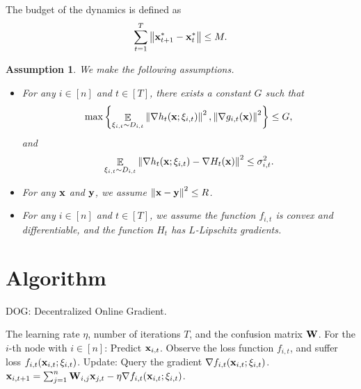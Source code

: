 \documentclass{article}
\newtheorem{Assumption}{\bf{Assumption}}
\begin{document}
The budget of the dynamics is defined as
\begin{align}
\nonumber
\sum_{t=1}^T \left\lVert{\bf x}_{t+1}^\ast - {\bf x}_t^\ast\right\rVert \le M.
\end{align}



\begin{Assumption}
\label{assumption_bounded_gradient_domain}
We make the following assumptions.
\begin{itemize}
\item For any $i\in[n]$ and $t\in[T]$, there exists a constant $G$ such that
\begin{align}
\nonumber
\max\left\{ \mathop{\mathbb{E}}_{ \xi_{i,t} \sim D_{i,t} }\left\lVert\nabla h_t({\bf x};\xi_{i,t})\right\rVert^2,  \left\lVert\nabla g_{i,t}({\bf x})\right\rVert^2 \right\} \le G,
\end{align} and 
\begin{align}
\nonumber
\mathop{\mathbb{E}}_{ \xi_{i,t} \sim D_{i,t} } \left\lVert\nabla h_t({\bf x}; \xi_{i,t}) - \nabla H_t({\bf x})\right\rVert^2 \le \sigma_{i,t}^2.
\end{align}
\item For any ${\bf x}$ and ${\bf y}$, we assume $\left\lVert{\bf x}-{\bf y}\right\rVert^2 \le R$.
\item For any $i\in[n]$ and $t\in[T]$, we assume the function $f_{i,t}$ is convex and differentiable, and the function $H_t$ has  $L$-Lipschitz gradients.
\end{itemize}

 
\end{Assumption}



\section{Algorithm}


\newcommand\StateX{\Statex\hspace{\algorithmicindent}}
\begin{algorithm}[!]
   \caption{DOG: Decentralized Online Gradient.}
   \label{algo_dog}
   \begin{algorithmic}[1]
   \Require The learning rate $\eta$, number of iterations $T$, and the confusion matrix ${\bf W}$.
           \StateX For the $i$-th node with $i\in[n]$:
            \State \indent Predict ${\bf x}_{i,t}$.
            \State \indent Observe the loss function $f_{i,t}$,
            \StateX \indent and suffer loss $f_{i,t}({\bf x}_{i,t};\xi_{i,t})$.
            \StateX Update:
            \State \indent Query the gradient $\nabla f_{i,t}({\bf x}_{i,t};\xi_{i,t})$.  
            \State \indent ${\bf x}_{i,t+1} = \sum_{j=1}^n {\bf W}_{i,j}{\bf x}_{j,t} - \eta \nabla f_{i,t}({\bf x}_{i,t};\xi_{i,t})$. 
       \EndFor
   \end{algorithmic}
\end{algorithm}
\end{document}

